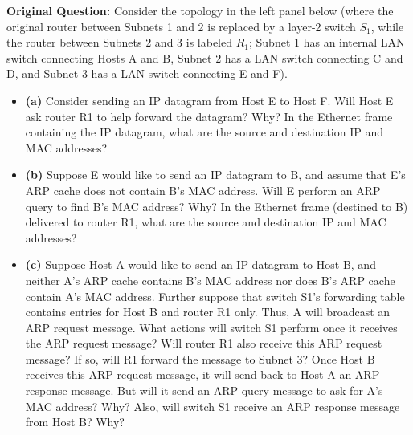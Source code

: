 \textbf{Original Question:} Consider the topology in the left panel below (where the original router between Subnets 1 and 2 is replaced by a layer-2 switch $S_1$, while the router between Subnets 2 and 3 is labeled $R_1$; Subnet 1 has an internal LAN switch connecting Hosts A and B, Subnet 2 has a LAN switch connecting C and D, and Subnet 3 has a LAN switch connecting E and F).
\begin{itemize}
\item \textbf{(a)} Consider sending an IP datagram from Host E to Host F. Will Host E ask router R1 to help forward the datagram? Why? In the Ethernet frame containing the IP datagram, what are the source and destination IP and MAC addresses?
\item \textbf{(b)} Suppose E would like to send an IP datagram to B, and assume that E's ARP cache does not contain B's MAC address. Will E perform an ARP query to find B's MAC address? Why? In the Ethernet frame (destined to B) delivered to router R1, what are the source and destination IP and MAC addresses?
\item \textbf{(c)} Suppose Host A would like to send an IP datagram to Host B, and neither A's ARP cache contains B's MAC address nor does B's ARP cache contain A's MAC address. Further suppose that switch S1's forwarding table contains entries for Host B and router R1 only. Thus, A will broadcast an ARP request message. What actions will switch S1 perform once it receives the ARP request message? Will router R1 also receive this ARP request message? If so, will R1 forward the message to Subnet 3? Once Host B receives this ARP request message, it will send back to Host A an ARP response message. But will it send an ARP query message to ask for A's MAC address? Why? Also, will switch S1 receive an ARP response message from Host B? Why?
\end{itemize}


